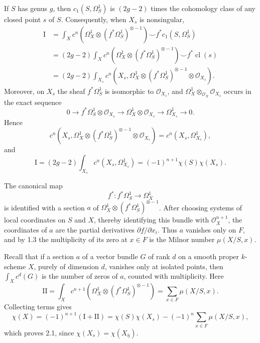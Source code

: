 If $S$ has genus $g$, then $c_1(S,\Omega_S^1)$ is $(2g-2)$
times the cohomology class of any closed point $s$ of $S$.
Consequently, when $X_s$ is nonsingular,
\begin{align*}
\mathrm I
&=\int_Xc^n\!\left(\Omega_X^1\otimes
(f^*\Omega_S^1)^{\otimes-1}\right)
\smile f^*c_1(S,\Omega_S^1)\\
&=(2g-2)\int_Xc^n\!\left(\Omega_X^1\otimes
(f^*\Omega_S^1)^{\otimes-1}\right)
\smile f^*\operatorname{cl}(s)\\
&=(2g-2)\int_{X_s}c^n\!\left(
X_s,\Omega_X^1\otimes(f^*\Omega_S^1)^{\otimes-1}
\otimes\mathcal O_{X_s}\right).
\end{align*}
Moreover, on $X_s$ the sheaf $f^*\Omega_S^1$ is isomorphic to
$\mathcal O_{X_s}$, and
$\Omega_X^1\otimes_{\mathcal O_X}\mathcal O_{X_s}$ occurs in the
exact sequence
\[
0\longrightarrow f^*\Omega_S^1\otimes\mathcal O_{X_s}
\longrightarrow\Omega_X^1\otimes\mathcal O_{X_s}
\longrightarrow\Omega_{X_s}^1\longrightarrow0.
\]
Hence
\[
c^n\!\left(X_s,\Omega_X^1\otimes
(f^*\Omega_S^1)^{\otimes-1}\otimes\mathcal O_{X_s}\right)
=c^n(X_s,\Omega_{X_s}^1),
\]
and
\[
\mathrm I=(2g-2)\int_{X_s}c^n(X_s,\Omega_{X_s}^1)
=(-1)^{n+1}\chi(S)\chi(X_s).
\]

The canonical map
\[
f^*:f^*\Omega_S^1\longrightarrow\Omega_X^1
\]
is identified with a section $a$ of
$\Omega_X^1\otimes(f^*\Omega_S^1)^{\otimes-1}$.  After choosing
systems of local coordinates on $S$ and $X$, thereby identifying
this bundle with $\mathcal O_X^{n+1}$, the coordinates of $a$ are
the partial derivatives $\partial f/\partial x_i$.  Thus $a$
vanishes only on $F$, and by 1.3 the multiplicity of its zero at
$x\in F$ is the Milnor number $\mu(X/S,x)$.

Recall that if a section $a$ of a vector bundle $G$ of rank $d$ on
a smooth proper $k$-scheme $X$, purely of dimension $d$, vanishes
only at isolated points, then $\int_Xc^d(G)$ is the number of zeros
of $a$, counted with multiplicity.  Here
\[
\mathrm{II}=\int_Xc^{n+1}\!\left(
\Omega_X^1\otimes(f^*\Omega_S^1)^{\otimes-1}\right)
=\sum_{x\in F}\mu(X/S,x).
\]
Collecting terms gives
\[
\chi(X)=(-1)^{n+1}(\mathrm I+\mathrm{II})
=\chi(S)\chi(X_s)-(-1)^n\sum_{x\in F}\mu(X/S,x),
\]
which proves 2.1, since
$\chi(X_s)=\chi(X_{\bar\eta})$.
